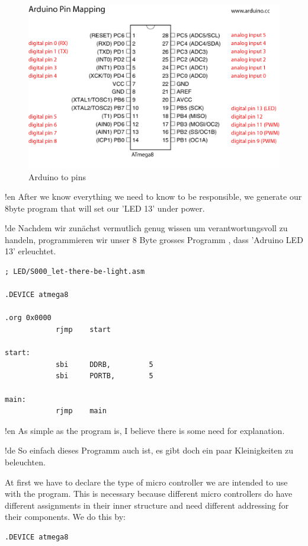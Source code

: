 \begin{figure}[htbp]
  \centering
  \includegraphics[width=120mm]{Media/www-arduino-cc_Arduino-To-Atmega8-Pins.png}
  \caption{Arduino to \at pins}
  \label{arduino-to-atmega-pins}
\end{figure}

!en After we know everything we need to know to be responsible, we generate our 8byte program that will set our 'LED 13' under power.

!de Nachdem wir zunächst vermutlich genug wissen um verantwortungsvoll zu handeln, programmieren wir unser 8 Byte grosses Programm , dass 'Adruino LED 13' erleuchtet.


\begin{lstlisting}
; LED/S000_let-there-be-light.asm

.DEVICE atmega8

.org 0x0000
            rjmp    start 

start:
            sbi     DDRB,         5
            sbi     PORTB,        5
            
main:
            rjmp    main
\end{lstlisting}

!en As simple as the program is, I believe there is some need for explanation.

!de So einfach dieses Programm auch ist, es gibt doch ein paar Kleinigkeiten zu beleuchten.

At first we have to declare the type of micro controller we are intended to use with the program. This is necessary because different micro controllers do have different assignments in their inner structure and need different addressing for their components. We do this by:

\begin{lstlisting}
.DEVICE atmega8
\end{lstlisting}

